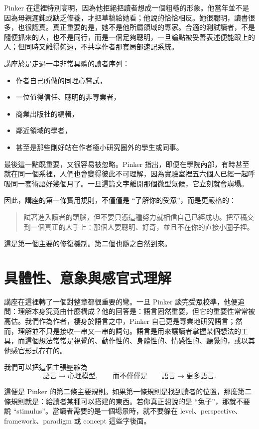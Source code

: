 Pinker 在這裡特別高明，因為他拒絕把讀者想成一個粗糙的形象。他當年並不是因為母親遲鈍或缺乏修養，才把草稿給她看；他說的恰恰相反。她很聰明，讀書很多，也很認真。真正重要的是，她不是他所屬領域的專家。合適的測試讀者，不是隨便抓來的人，也不是同行，而是一個足夠聰明，一旦論點被妥善表述便能跟上的人；但同時又離得夠遠，不共享作者那套局部速記系統。

講座於是走過一串非常具體的讀者序列：
\begin{itemize}
\item 作者自己所做的同理心嘗試，
\item 一位值得信任、聰明的非專業者，
\item 商業出版社的編輯，
\item 鄰近領域的學者，
\item 甚至是那些剛好站在作者極小研究圈外的學生或同事。
\end{itemize}

最後這一點既重要，又很容易被忽略。Pinker 指出，即便在學院內部，有時甚至就在同一個系裡，人們也會變得彼此不可理解，因為實驗室裡五六個人已經一起呼吸同一套術語好幾個月了。一旦這篇文字離開那個微型氣候，它立刻就會崩塌。

因此，講座的第一條實用規則，不僅僅是 ``了解你的受眾''，而是更嚴格的：
\begin{quote}
試著進入讀者的頭腦，但不要只憑這種努力就相信自己已經成功。把草稿交到一個真正的人手上：那個人要聰明、好奇，並且不在你的直接小圈子裡。
\end{quote}

這是第一個主要的修復機制。第二個也隨之自然到來。

\section{具體性、意象與感官式理解}

講座在這裡轉了一個對整章都很重要的彎。一旦 Pinker 談完受眾校準，他便追問：理解本身究竟由什麼構成？他的回答是：語言固然重要，但它的重要性常常被高估。我們作為作者，棲身於語言之中，Pinker 自己更是專業地研究語言；然而，理解並不只是接收一串又一串的詞句。語言是用來讓讀者掌握某個想法的工具，而這個想法常常是視覺的、動作性的、身體性的、情感性的、聽覺的，或以其他感官形式存在的。

我們可以把這個主張壓縮為
\begin{equation}
\text{語言} \to \text{心理模型},
\qquad
\text{而不僅僅是}
\qquad
\text{語言} \to \text{更多語言}.
\end{equation}

這便是 Pinker 的第二條主要規則。如果第一條規則是找到讀者的位置，那麼第二條規則就是：給讀者某種可以搭建的東西。若你真正想說的是 ``兔子''，那就不要說 ``stimulus''。當讀者需要的是一個場景時，就不要躲在 level、perspective、framework、paradigm 或 concept 這些字後面。


